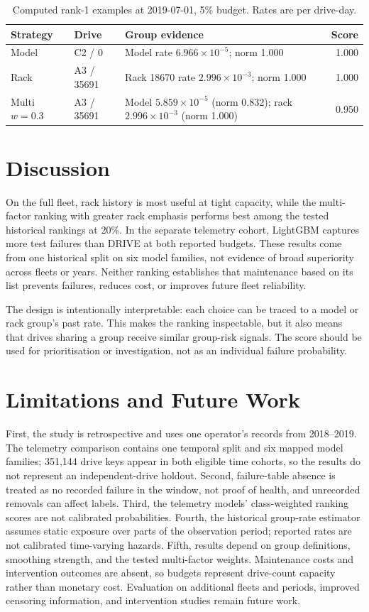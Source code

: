 \documentclass[conference]{IEEEtran}
\begin{document}
\begin{table}[t]
\caption{Computed rank-1 examples at 2019-07-01, 5\% budget. Rates are per drive-day.}
\label{tab:explanation-example}
\centering
\scriptsize
\begin{tabular}{p{1.5cm}p{1.7cm}p{3.1cm}r}
\toprule
Strategy & Drive & Group evidence & Score \\
\midrule
Model & C2 / 0 & Model rate $6.966\times10^{-5}$; norm 1.000 & 1.000 \\
Rack & A3 / 35691 & Rack 18670 rate $2.996\times10^{-3}$; norm 1.000 & 1.000 \\
Multi $w=0.3$ & A3 / 35691 & Model $5.859\times10^{-5}$ (norm 0.832); rack $2.996\times10^{-3}$ (norm 1.000) & 0.950 \\
\bottomrule
\end{tabular}
\end{table}

\section{Discussion}
On the full fleet, rack history is most useful at tight capacity, while the multi-factor
ranking with greater rack emphasis performs best among the tested historical rankings
at 20\%. In the separate telemetry cohort, LightGBM captures more test failures than
DRIVE at both reported budgets. These results come from one historical split on six
model families, not evidence of broad superiority across fleets or years. Neither
ranking establishes that maintenance based on its list prevents failures, reduces
cost, or improves future fleet reliability.

The design is intentionally interpretable: each choice can be traced to a model or
rack group's past rate. This makes the ranking inspectable, but it also means that
drives sharing a group receive similar group-risk signals. The score should be used
for prioritisation or investigation, not as an individual failure probability.

\section{Limitations and Future Work}
First, the study is retrospective and uses one operator's records from 2018--2019. The
telemetry comparison contains one temporal split and six mapped model families; 351,144 drive keys appear
in both eligible time cohorts, so the results do not represent an independent-drive
holdout. Second, failure-table absence is treated as no recorded failure in the window,
not proof of health, and unrecorded removals can affect labels. Third, the telemetry
models' class-weighted ranking scores are not calibrated probabilities. Fourth, the
historical group-rate
estimator assumes static exposure over parts of the observation period; reported rates
are not calibrated time-varying hazards. Fifth, results depend on group definitions,
smoothing strength, and the tested multi-factor weights. Maintenance costs and
intervention outcomes are absent, so budgets represent drive-count capacity rather
than monetary cost. Evaluation on additional fleets and periods, improved censoring
information, and intervention studies remain future work.
\end{document}
